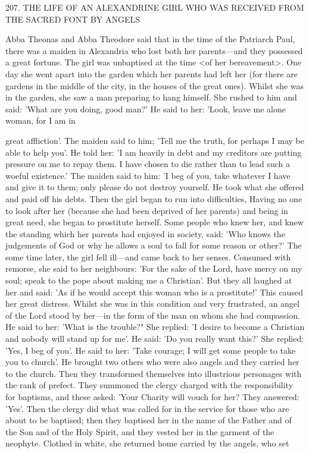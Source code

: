207. THE LIFE OF AN ALEXANDRINE GIRL
WHO WAS RECEIVED FROM THE SACRED FONT
BY ANGELS

Abba Theonas and Abba Theodore said that in the time of the
Patriarch Paul, there was a maiden in Alexandria who lost both her
parents—and they possessed a great fortune. The girl was
unbaptised at the time <of her bereavement>. One day she went
apart into the garden which her parents had left her (for there are
gardens in the middle of the city, in the houses of the great ones).
Whilst she was in the garden, she saw a man preparing to hang
himself. She rushed to him and said: 'What are you doing, good
man?' He said to her: 'Look, leave me alone woman, for I am in

great affliction'. The maiden said to him; 'Tell me the truth, for
perhaps I may be able to help you'. He told her: 'I am heavily in
debt and my creditors are putting pressure on me to repay them. I
have chosen to die rather than to lead such a woeful existence.' The
maiden said to him: 'I beg of you, take whatever I have and give it
to them; only please do not destroy yourself. He took what she
offered and paid off his debts. Then the girl began to run into
difficulties, Having no one to look after her (because she had been
deprived of her parents) and being in great need, she began to
prostitute herself. Some people who knew her, and knew the
standing which her parents had enjoyed in society, said: 'Who
knows the judgements of God or why he allows a soul to fall for
some reason or other?' The some time later, the girl fell ill—and
came back to her senses. Consumed with remorse, she said to her
neighbours: 'For the sake of the Lord, have mercy on my soul;
speak to the pope about making me a Christian'. But they all
laughed at her and said: 'As if he would accept this woman who is
a prostitute!' This caused her great distress. Whilst she was in this
condition and very frustrated, an angel of the Lord stood by her—in
the form of the man on whom she had compassion. He said to her:
'What is the trouble?" She replied: 'I desire to become a Christian
and nobody will stand up for me'. He said: 'Do you really want
this?' She replied: 'Yes, I beg of you'. He said to her: 'Take courage;
I will get some people to take you to church'. He brought two
others who were also angels and they carried her to the church.
Then they transformed themselves into illustrious personages with
the rank of prefect. They summoned the clergy charged with the
responsibility for baptisms, and these asked: 'Your Charity will
vouch for her? They answered: 'Yes'. Then the clergy did what was
called for in the service for those who are about to be baptised; then
they baptised her in the name of the Father and of the Son and of
the Holy Spirit, and they vested her in the garment of the neophyte.
Clothed in white, she returned home carried by the angels, who set

